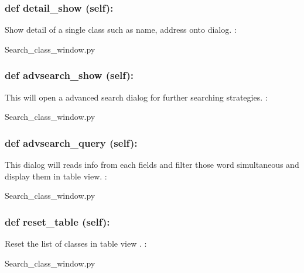 \hypertarget{class_poly_a14a7ad77ce612b0c54f531d307ee4b39}{
\subsubsection[{def detail_show (self):}]{\setlength{\rightskip}{0pt plus 5cm}def {detail\_show} (self):}}\label{class_poly_a14a7ad77ce612b0c54f531d307ee4b39}
Show detail of a single class such as name, address onto dialog.
:\begin{DoxyCompactItemize}
\item 
Search\_class\_window.\-py\end{DoxyCompactItemize}

\hypertarget{class_poly_a14a7ad77ce612b0c54f531d307ee4b39}{
\subsubsection[{def advsearch_show (self):}]{\setlength{\rightskip}{0pt plus 5cm}def {advsearch\_show} (self):}}\label{class_poly_a14a7ad77ce612b0c54f531d307ee4b39}
This will open a advanced search dialog for further searching strategies. 
:\begin{DoxyCompactItemize}
\item 
Search\_class\_window.\-py\end{DoxyCompactItemize}

\hypertarget{class_poly_a14a7ad77ce612b0c54f531d307ee4b39}{
\subsubsection[{def advsearch_query (self):}]{\setlength{\rightskip}{0pt plus 5cm}def {advsearch\_query} (self):}}\label{class_poly_a14a7ad77ce612b0c54f531d307ee4b39}
This dialog will reads info from each fields and filter those word simultaneous and display them in table view. 
:\begin{DoxyCompactItemize}
\item 
Search\_class\_window.\-py\end{DoxyCompactItemize}

\hypertarget{class_poly_a14a7ad77ce612b0c54f531d307ee4b39}{
\subsubsection[{def reset_table (self):}]{\setlength{\rightskip}{0pt plus 5cm}def {reset\_table} (self):}}\label{class_poly_a14a7ad77ce612b0c54f531d307ee4b39}
Reset the list of classes in table view .
:\begin{DoxyCompactItemize}
\item 
Search\_class\_window.\-py\end{DoxyCompactItemize}

